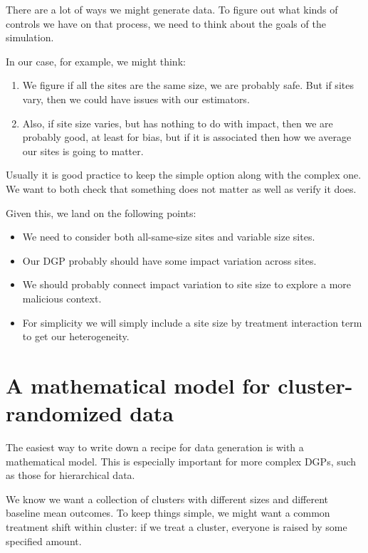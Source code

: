 \documentclass[
]{book}
\providecommand{\tightlist}{%
  \setlength{\itemsep}{0pt}\setlength{\parskip}{0pt}}
\begin{document}
There are a lot of ways we might generate data.
To figure out what kinds of controls we have on that process, we need to think about the goals of the simulation.

In our case, for example, we might think:

\begin{enumerate}
\def\labelenumi{\arabic{enumi})}
\tightlist
\item
  We figure if all the sites are the same size, we are probably safe. But if sites vary, then we could have issues with our estimators.
\item
  Also, if site size varies, but has nothing to do with impact, then we are probably good, at least for bias, but if it is associated then how we average our sites is going to matter.
\end{enumerate}

Usually it is good practice to keep the simple option along with the complex one.
We want to both check that something does not matter as well as verify it does.

Given this, we land on the following points:

\begin{itemize}
\tightlist
\item
  We need to consider both all-same-size sites and variable size sites.
\item
  Our DGP probably should have some impact variation across sites.
\item
  We should probably connect impact variation to site size to explore a more malicious context.
\item
  For simplicity we will simply include a site size by treatment interaction term to get our heterogeneity.
\end{itemize}

\hypertarget{a-mathematical-model-for-cluster-randomized-data}{%
\section{A mathematical model for cluster-randomized data}\label{a-mathematical-model-for-cluster-randomized-data}}

The easiest way to write down a recipe for data generation is with a mathematical model.
This is especially important for more complex DGPs, such as those for hierarchical data.

We know we want a collection of clusters with different sizes and different baseline mean outcomes.
To keep things simple, we might want a common treatment shift within cluster: if we treat a cluster, everyone is raised by some specified amount.
\end{document}

